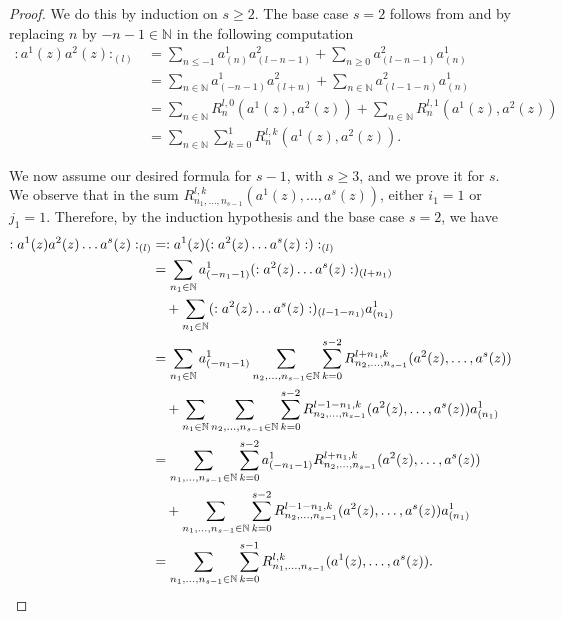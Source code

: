 \documentclass[a4paper, 12pt, reqno]{amsart}
\theoremstyle{remark}
\begin{document}
\begin{proof}
  We do this by induction on $s \ge 2$.
  The base case $s = 2$ follows from  and by replacing $n$ by $-n - 1 \in \mathbb{N}$ in the following computation
  \begin{align*}
    :a^1(z)a^2(z):_{(l)} &= \sum_{n \le -1}a^1_{(n)}a^2_{(l - n - 1)} + \sum_{n \ge 0}a^2_{(l - n - 1)}a^1_{(n)} \\
                         &= \sum_{n \in \mathbb{N}}a^1_{(-n - 1)}a^2_{(l + n)} + \sum_{n \in \mathbb{N}}a^2_{(l - 1 - n)}a^1_{(n)} \\
                         &= \sum_{n \in \mathbb{N}}R^{l, 0}_n(a^1(z), a^2(z)) + \sum_{n \in \mathbb{N}}R^{l, 1}_n(a^1(z), a^2(z)) \\
                         &= \sum_{n \in \mathbb{N}}\sum_{k = 0}^1R^{l, k}_n(a^1(z), a^2(z)).
  \end{align*}

  We now assume our desired formula for $s - 1$, with $s \ge 3$, and we prove it for $s$.
  We observe that in the sum $R^{l, k}_{n_1, \dots, n_{s - 1}}(a^1(z), \dots, a^s(z))$, either $i_1 = 1$ or $j_1 = 1$.
  Therefore, by the induction hypothesis and the base case $s = 2$, we have
  \begin{align*}
    :a^1(z)a^2(z)\dots a^s(z):_{(l)} &= :a^1(z)(:a^2(z)\dots a^s(z):):_{(l)} \\
                                     &= \sum_{n_1 \in \mathbb{N}}a^1_{(-n_1 - 1)}(:a^2(z)\dots a^s(z):)_{(l + n_1)} \\
                                     &\quad + \sum_{n_1 \in \mathbb{N}}(:a^2(z)\dots a^s(z):)_{(l - 1 - n_1)}a^1_{(n_1)} \\
                                     &= \sum_{n_1 \in \mathbb{N}}a^1_{(-n_1 - 1)}\sum_{n_2, \dots, n_{s - 1} \in \mathbb{N}}\sum_{k = 0}^{s - 2}R^{l + n_1, k}_{n_2, \dots, n_{s - 1}}(a^2(z), \dots, a^s(z)) \\
                                     &\quad + \sum_{n_1 \in \mathbb{N}}\sum_{n_2, \dots, n_{s - 1} \in \mathbb{N}}\sum_{k = 0}^{s - 2}R^{l - 1 - n_1, k}_{n_2, \dots, n_{s - 1}}(a^2(z), \dots, a^s(z))a^1_{(n_1)} \\
                                     &= \sum_{n_1, \dots, n_{s - 1} \in \mathbb{N}}\sum_{k = 0}^{s - 2}a^1_{(-n_1 - 1)}R^{l + n_1, k}_{n_2, \dots, n_{s - 1}}(a^2(z), \dots, a^s(z)) \\
                                     &\quad + \sum_{n_1, \dots, n_{s - 1} \in \mathbb{N}}\sum_{k = 0}^{s - 2}R^{l - 1 - n_1, k}_{n_2, \dots, n_{s - 1}}(a^2(z), \dots, a^s(z))a^1_{(n_1)} \\
                                     &= \sum_{n_1, \dots, n_{s - 1} \in \mathbb{N}}\sum_{k = 0}^{s - 1}R^{l, k}_{n_1, \dots, n_{s - 1}}(a^1(z), \dots, a^s(z)). \qedhere
  \end{align*}
\end{proof}
\end{document}
